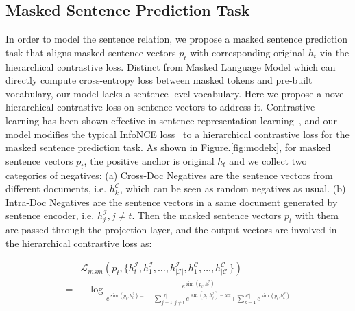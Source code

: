 \documentclass{article} %
\begin{document}
\subsection {Masked Sentence Prediction Task} 
\label{sec:prediction}



In order to model the sentence relation, we propose a masked sentence prediction task that aligns masked sentence vectors $p_t$ with corresponding original $h_t$ via the hierarchical contrastive loss. Distinct from Masked Language Model which can directly compute cross-entropy loss between masked tokens and pre-built vocabulary, our model lacks a sentence-level vocabulary. Here we propose a novel hierarchical contrastive loss on sentence vectors to address it. Contrastive learning has been shown effective in sentence representation learning~\citep{DPR2020, gao-etal-2021-simcse}, and our model modifies the typical InfoNCE loss~\citep{oord2018representation} to a hierarchical contrastive loss for the masked sentence prediction task. As shown in Figure.\ref{fig:modelx}, for masked sentence vectors $p_t$, the positive anchor is original $h_t$ and we collect two categories of negatives: (a) Cross-Doc Negatives are the sentence vectors from different documents, i.e. $h^{\mathcal{C}}_k$, which can be seen as random negatives as usual. (b) Intra-Doc Negatives are the sentence vectors in a same document generated by sentence encoder, i.e. $h^{\mathcal{I}}_j, j{\neq}t $. Then the masked sentence vectors $p_t$ with them are passed through the projection layer, and the output vectors are involved in the hierarchical contrastive loss as: 

\begin{equation}
\label{eq:loss}
\begin{aligned}
     & \mathcal{L}_{msm}(p_t, \{h^{\mathcal{I}}_t, h^{\mathcal{I}}_1, \ldots, h^{\mathcal{I}}_{|\mathcal{I}|}, h^{\mathcal{C}}_1, \ldots, h^{\mathcal{C}}_{|\mathcal{C}|}\}) 
    \\ = & -\log \frac{e^{\operatorname{sim}\left(p_{t}, h^{\mathcal{I}}_t\right)}}{{e^{\operatorname{sim}\left(p_{t}, h^{\mathcal{I}}_t\right) - }+\sum_{j=1, j{\neq}t}^{|\mathcal{I}|} e^{\operatorname{sim}\left(p_{t}, h^{\mathcal{I}}_j\right) - \mu{\alpha}}}{+ \sum_{k=1}^{|\mathcal{C}|} e^{\operatorname{sim}\left(p_{t}, h^{\mathcal{C}}_k\right)}}}
\end{aligned}
\end{equation}
\end{document}
